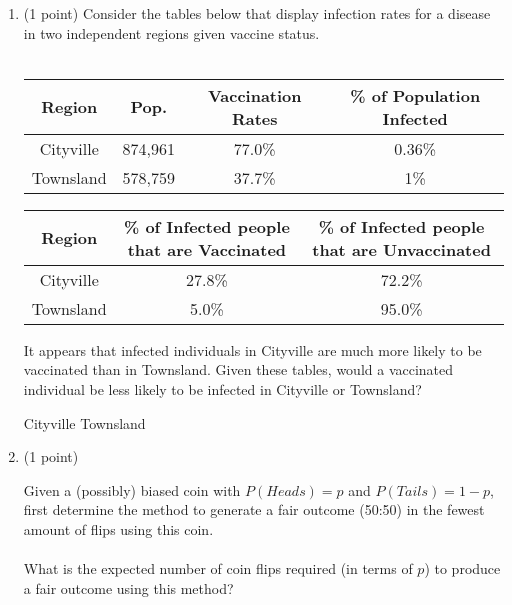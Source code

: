 
\begin{enumerate}[start]

\item (1 point) Consider the tables below that display infection rates for a disease in two independent regions given vaccine status.
%
\\\\
\begin{tabular}{ |c|c|c|c| } 
	\hline
	Region & Pop. & Vaccination Rates & \% of Population Infected \\
	\hline
	Cityville & 874,961 & 77.0\% & 0.36\% \\ 
	\hline
	Townsland & 578,759 & 37.7\% &  1\%\\ 
	\hline
\end{tabular}

\vspace{0.5cm}

\begin{tabular}{ |c|c|c| } 
	\hline
	Region & \% of Infected people that are Vaccinated & \% of Infected people that are Unvaccinated\\
	\hline
	Cityville & 27.8\% & 72.2\%  \\ 
	\hline
	Townsland & 5.0\% & 95.0\%\\ 
	\hline
\end{tabular}

It appears that infected individuals in Cityville are much more likely to be vaccinated than in Townsland. Given these tables, would a vaccinated individual be less likely to be infected in Cityville or Townsland?


\begin{oneparcheckboxes}
\choice Cityville
\choice Townsland
\end{oneparcheckboxes}




\item (1 point)

Given a (possibly) biased coin with $P(Heads) = p$ and $P(Tails) = 1 - p$, first determine the method to generate a fair outcome (50:50) in the fewest amount of flips using this coin.
\\\\
What is the expected number of coin flips required (in terms of $p$) to produce a fair outcome using this method?

\vspace{0.5cm}


\end{enumerate}
